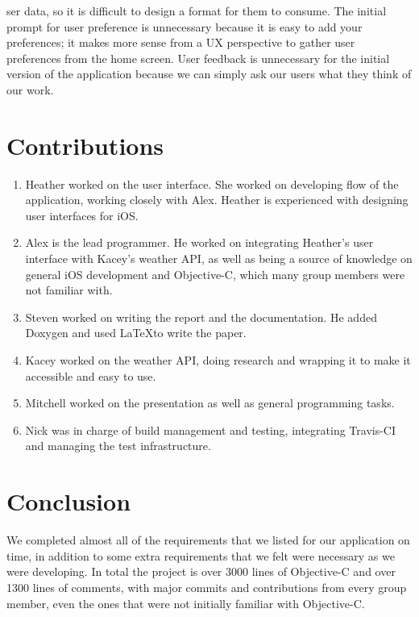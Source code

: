 \documentclass[11pt]{article}
\begin{document}
ser data, so it is difficult to design a format for them to consume. The initial prompt for user preference is unnecessary because it is easy to add your preferences; it makes more sense from a UX perspective to gather user preferences from the home screen. User feedback is unnecessary for the initial version of the application because we can simply ask our users what they think of our work.

% 

\section{Contributions}
\begin{enumerate}
\item Heather worked on the user interface. She worked on developing flow of the application, working closely with Alex. Heather is experienced with designing user interfaces for iOS.
\item Alex is the lead programmer. He worked on integrating Heather's user interface with Kacey's weather API, as well as being a source of knowledge on general iOS development and Objective-C, which many group members were not familiar with.
\item Steven worked on writing the report and the documentation. He added Doxygen and used \LaTeX to write the paper. 
\item Kacey worked on the weather API, doing research and wrapping it to make it accessible and easy to use. 
\item Mitchell worked on the presentation as well as general programming tasks.
\item Nick was in charge of build management and testing, integrating Travis-CI and managing the test infrastructure.
\end{enumerate}

\section{Conclusion}
We completed almost all of the requirements that we listed for our application on time, in addition to some extra requirements that we felt were necessary as we were developing. In total the project is over 3000 lines of Objective-C and over 1300 lines of comments, with major commits and contributions from every group member, even the ones that were not initially familiar with Objective-C. 
\end{document}
